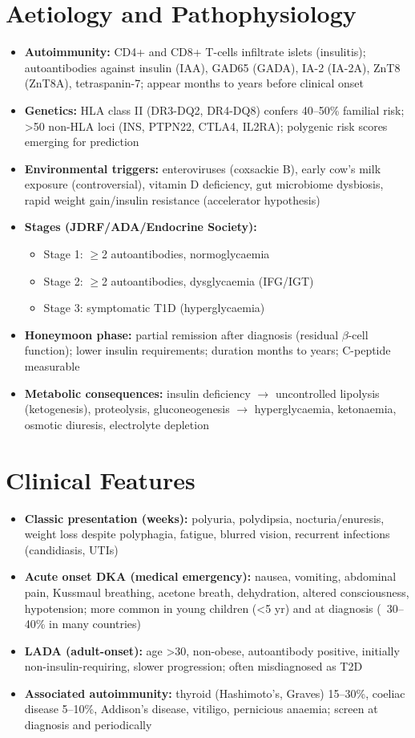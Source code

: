 \section*{Aetiology and Pathophysiology}
\begin{itemize}
    \item \textbf{Autoimmunity:} CD4+ and CD8+ T-cells infiltrate islets (insulitis); autoantibodies against insulin (IAA), GAD65 (GADA), IA-2 (IA-2A), ZnT8 (ZnT8A), tetraspanin-7; appear months to years before clinical onset
    \item \textbf{Genetics:} HLA class II (DR3-DQ2, DR4-DQ8) confers 40--50\% familial risk; >50 non-HLA loci (INS, PTPN22, CTLA4, IL2RA); polygenic risk scores emerging for prediction
    \item \textbf{Environmental triggers:} enteroviruses (coxsackie B), early cow's milk exposure (controversial), vitamin D deficiency, gut microbiome dysbiosis, rapid weight gain/insulin resistance (accelerator hypothesis)
    \item \textbf{Stages (JDRF/ADA/Endocrine Society):}
    \begin{itemize}
        \item Stage 1: $\ge$2 autoantibodies, normoglycaemia
        \item Stage 2: $\ge$2 autoantibodies, dysglycaemia (IFG/IGT)
        \item Stage 3: symptomatic T1D (hyperglycaemia)
    \end{itemize}
    \item \textbf{Honeymoon phase:} partial remission after diagnosis (residual $\beta$-cell function); lower insulin requirements; duration months to years; C-peptide measurable
    \item \textbf{Metabolic consequences:} insulin deficiency $\to$ uncontrolled lipolysis (ketogenesis), proteolysis, gluconeogenesis $\to$ hyperglycaemia, ketonaemia, osmotic diuresis, electrolyte depletion
\end{itemize}

\section*{Clinical Features}
\begin{itemize}
    \item \textbf{Classic presentation (weeks):} polyuria, polydipsia, nocturia/enuresis, weight loss despite polyphagia, fatigue, blurred vision, recurrent infections (candidiasis, UTIs)
    \item \textbf{Acute onset DKA (medical emergency):} nausea, vomiting, abdominal pain, Kussmaul breathing, acetone breath, dehydration, altered consciousness, hypotension; more common in young children (<5 yr) and at diagnosis (~30--40\% in many countries)
    \item \textbf{LADA (adult-onset):} age >30, non-obese, autoantibody positive, initially non-insulin-requiring, slower progression; often misdiagnosed as T2D
    \item \textbf{Associated autoimmunity:} thyroid (Hashimoto's, Graves) 15--30\%, coeliac disease 5--10\%, Addison's disease, vitiligo, pernicious anaemia; screen at diagnosis and periodically
\end{itemize}


